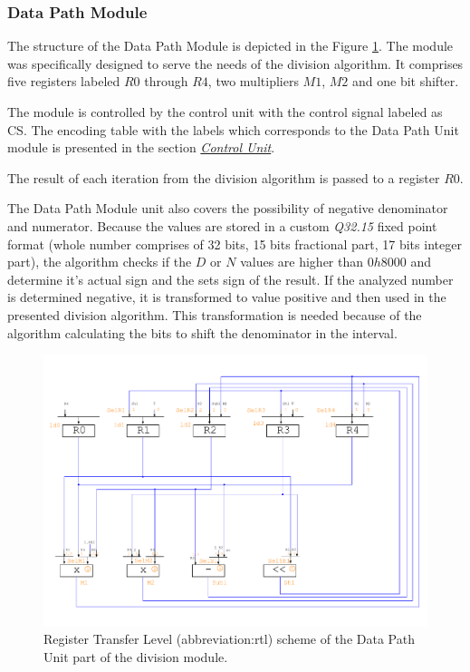 \documentclass[a4paper, twoside, 11pt]{article}
\begin{document}
\subsubsection{Data Path Module}
The structure of the Data Path Module is depicted in the Figure \ref{fig:division-rtl}. The module was specifically designed to serve the needs of the division algorithm. It comprises five registers labeled $R0$ through $R4$, two multipliers $M1$, $M2$ and one bit shifter.\par
The module is controlled by the control unit with the control signal labeled as CS. The encoding table with the labels which corresponds to the Data Path Unit module is presented in the section \hyperref[subsubsec:division-control-unit]{\textit{Control Unit}}.\par
The result of each iteration from the division algorithm is passed to a register $R0$.\par
The Data Path Module unit also covers the possibility of negative denominator and numerator. Because the values are stored in a custom \textit{Q32.15} fixed point format (whole number comprises of 32 bits, 15 bits fractional part, 17 bits integer part), the algorithm checks if the $D$ or $N$ values are higher than $0h8000$ and determine it's actual sign and the sets sign of the result. If the analyzed number is determined negative, it is transformed to value positive and then used in the presented division algorithm. This transformation is needed because of the algorithm calculating the bits to shift the denominator in the interval.
\begin{figure}[htbp!]
  \centering
  \includegraphics[width=1\textwidth]{src/pdf/rtl.pdf}
    \caption{Register Transfer Level (\gls{abbreviation:rtl}) scheme of the Data Path Unit part of the division module.}
  \label{fig:division-rtl}
\end{figure}
\end{document}
